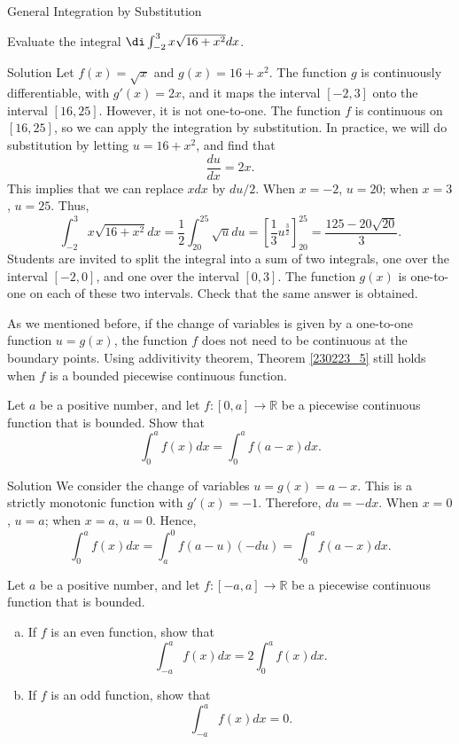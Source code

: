 \begin{example}[label=20230527]{}
\begin{theorem}{General Integration by Substitution}
\end{theorem}

\begin{example}{}
 Evaluate the integral $\di \int_{-2}^3x\sqrt{16+x^2}dx$. 
\end{example}\begin{solution}{Solution} Let $f(x)=\sqrt{x}$ and $g(x)=16+x^2$. The function $g$ is continuously differentiable, with $g'(x)=2x$, and it maps the interval $[-2, 3]$ onto the interval $[16, 25]$. However, it is not one-to-one. The function $f$ is continuous on $[16, 25]$, so we can  apply the integration by substitution. In practice, we will do substitution by letting $u=16+x^2$, and find that \[\frac{du}{dx}=2x.\]\bs
This implies that we can replace $xdx$ by $du/2$. When $x=-2$, $u=20$; when $x=3$, $u=25$. Thus,
\[\int_{-2}^3x\sqrt{16+x^2}dx=\frac{1}{2}\int_{20}^{25}\sqrt{u}du=\left[\frac{1}{3}u^{\frac{3}{2}}\right]_{20}^{25}=\frac{125-20\sqrt{20}}{3}.\]
Students are invited to split the integral into a sum of two integrals, one over the interval $[-2,0]$, and one over the interval $[0, 3]$. The function $g(x)$ is one-to-one on each of these two intervals. Check that the same answer is obtained.


\end{solution}
As we mentioned before, if the change of variables  is given by a one-to-one function $u=g(x)$, the function $f$ does not need to be continuous at the boundary points. Using addivitivity theorem, Theorem \ref{230223_5} still holds when $f$ is a bounded piecewise continuous function.
\begin{example}
{}Let $a$ be a positive number, and let $f:[0,a]\to\mathbb{R}$ be a piecewise continuous function that is bounded.
Show that 
\[\int_0^af(x)dx=\int_0^af(a-x)dx.\]
\end{example}
\begin{solution}{Solution}
We consider the change of variables $u=g(x)=a-x$. This is a strictly monotonic function with $g'(x)=-1$. Therefore, $du=-dx$. When $x=0$, $u=a$; when $x=a$, $u=0$. Hence,
\[\int_0^af(x)dx= \int_a^0f(a-u)(-du)=\int_0^af(a-x)dx.\]
\end{solution}
\begin{example}
{}Let $a$ be a positive number, and let $f:[-a,a]\to\mathbb{R}$ be a piecewise continuous function that is bounded.
\begin{enumerate}[(a)]
\item If $f$ is an even function, show that 
\[\int_{-a}^a f(x)dx=2\int_0^af(x)dx.\]
\item If $f$ is an odd function, show that 
\[\int_{-a}^a f(x)dx=0.\]


\end{enumerate}
\end{example}
\end{example}
